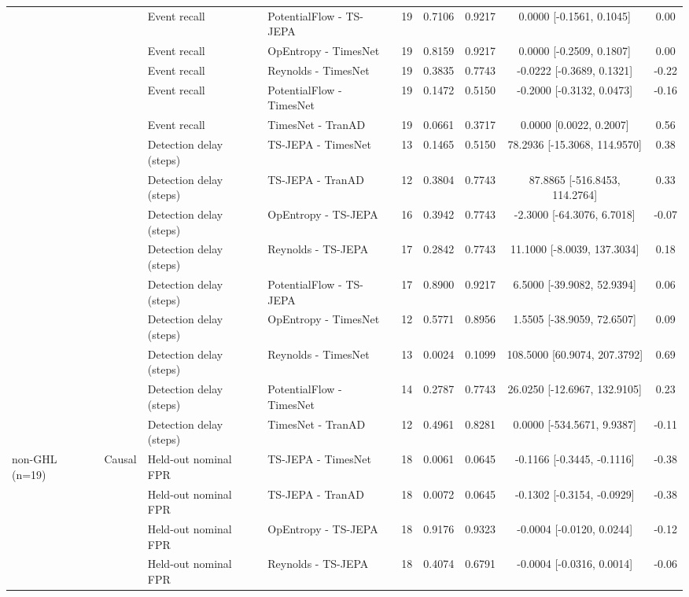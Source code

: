 {\begin{longtable}{@{}llllccccc@{}}
 &  & Event recall & PotentialFlow - TS-JEPA & 19 & 0.7106 & 0.9217 & 0.0000 [-0.1561, 0.1045] & 0.00 \\
 &  & Event recall & OpEntropy - TimesNet & 19 & 0.8159 & 0.9217 & 0.0000 [-0.2509, 0.1807] & 0.00 \\
 &  & Event recall & Reynolds - TimesNet & 19 & 0.3835 & 0.7743 & -0.0222 [-0.3689, 0.1321] & -0.22 \\
 &  & Event recall & PotentialFlow - TimesNet & 19 & 0.1472 & 0.5150 & -0.2000 [-0.3132, 0.0473] & -0.16 \\
 &  & Event recall & TimesNet - TranAD & 19 & 0.0661 & 0.3717 & 0.0000 [0.0022, 0.2007] & 0.56 \\
 &  & Detection delay (steps) & TS-JEPA - TimesNet & 13 & 0.1465 & 0.5150 & 78.2936 [-15.3068, 114.9570] & 0.38 \\
 &  & Detection delay (steps) & TS-JEPA - TranAD & 12 & 0.3804 & 0.7743 & 87.8865 [-516.8453, 114.2764] & 0.33 \\
 &  & Detection delay (steps) & OpEntropy - TS-JEPA & 16 & 0.3942 & 0.7743 & -2.3000 [-64.3076, 6.7018] & -0.07 \\
 &  & Detection delay (steps) & Reynolds - TS-JEPA & 17 & 0.2842 & 0.7743 & 11.1000 [-8.0039, 137.3034] & 0.18 \\
 &  & Detection delay (steps) & PotentialFlow - TS-JEPA & 17 & 0.8900 & 0.9217 & 6.5000 [-39.9082, 52.9394] & 0.06 \\
 &  & Detection delay (steps) & OpEntropy - TimesNet & 12 & 0.5771 & 0.8956 & 1.5505 [-38.9059, 72.6507] & 0.09 \\
 &  & Detection delay (steps) & Reynolds - TimesNet & 13 & 0.0024 & 0.1099 & 108.5000 [60.9074, 207.3792] & 0.69 \\
 &  & Detection delay (steps) & PotentialFlow - TimesNet & 14 & 0.2787 & 0.7743 & 26.0250 [-12.6967, 132.9105] & 0.23 \\
 &  & Detection delay (steps) & TimesNet - TranAD & 12 & 0.4961 & 0.8281 & 0.0000 [-534.5671, 9.9387] & -0.11 \\
\midrule
non-GHL (n=19) & Causal & Held-out nominal FPR & TS-JEPA - TimesNet & 18 & 0.0061 & 0.0645 & -0.1166 [-0.3445, -0.1116] & -0.38 \\
 &  & Held-out nominal FPR & TS-JEPA - TranAD & 18 & 0.0072 & 0.0645 & -0.1302 [-0.3154, -0.0929] & -0.38 \\
 &  & Held-out nominal FPR & OpEntropy - TS-JEPA & 18 & 0.9176 & 0.9323 & -0.0004 [-0.0120, 0.0244] & -0.12 \\
 &  & Held-out nominal FPR & Reynolds - TS-JEPA & 18 & 0.4074 & 0.6791 & -0.0004 [-0.0316, 0.0014] & -0.06 \\

\end{longtable}}
